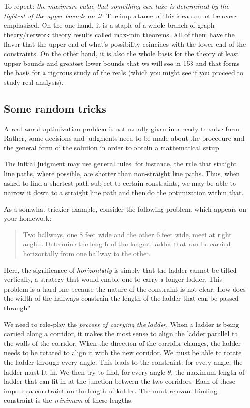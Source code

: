 \documentclass[10pt]{amsart}
\begin{document}
To repeat: {\em the maximum value that something can take is
determined by the tightest of the upper bounds on it.} The importance
of this idea cannot be over-emphasized. On the one hand, it is a
staple of a whole branch of graph theory/network theory results called
max-min theorems. All of them have the flavor that the upper end of
what's possibility coincides with the lower end of the constraints. On
the other hand, it is also the whole basis for the theory of least
upper bounds and greatest lower bounds that we will see in 153 and
that forms the basis for a rigorous study of the reals (which you
might see if you proceed to study real analysis).

\subsection{Some random tricks}

A real-world optimization problem is not usually given in a
ready-to-solve form. Rather, some decisions and judgments need to be
made about the procedure and the general form of the solution in order
to obtain a mathematical setup.

The initial judgment may use general rules: for instance, the rule
that straight line paths, where possible, are shorter than
non-straight line paths. Thus, when asked to find a shortest path
subject to certain constraints, we may be able to narrow it down to a
straight line path and then do the optimization within that.

As a somwhat trickier example, consider the following problem, which
appears on your homework:

\begin{quote}
  Two hallways, one $8$ feet wide and the other $6$ feet wide, meet at
  right angles. Determine the length of the longest ladder that can be
  carried horizontally from one hallway to the other.
\end{quote}

Here, the significance of {\em horizontally} is simply that the ladder
cannot be tilted vertically, a strategy that would enable one to carry
a longer ladder. This problem is a hard one because the nature of the
constraint is not clear. How does the width of the hallways constrain
the length of the ladder that can be passed through?

We need to role-play the {\em process of carrying the ladder}. When a
ladder is being carried along a corridor, it makes the most sense to
align the ladder parallel to the walls of the corridor. When the
direction of the corridor changes, the ladder needs to be rotated to
align it with the new corridor. We must be able to rotate the ladder
through every angle. This leads to the constraint: for every angle,
the ladder must fit in. We then try to find, for every angle $\theta$,
the maximum length of ladder that can fit in at the junction between
the two corridors. Each of these imposes a constraint on the length of
ladder. The most relevant binding constraint is the {\em minimum} of
these lengths.
\end{document}
